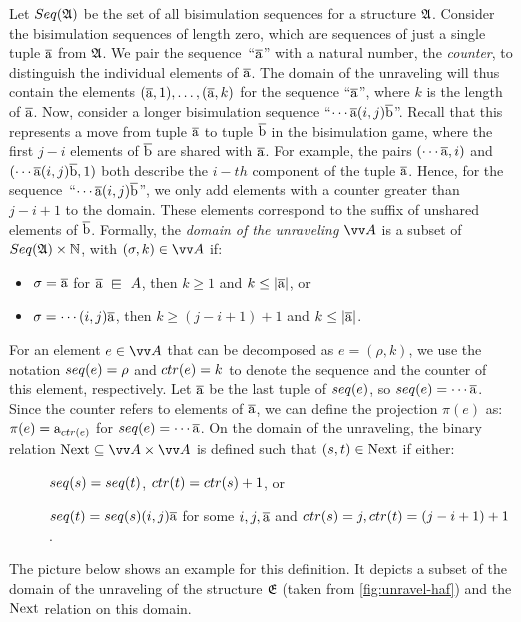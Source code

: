 Let $\Seq{\str{A}}$ be the set of all bisimulation sequences for a structure ${\mathfrak{A}}$.
Consider the bisimulation sequences of length zero, which are sequences of just a single tuple $\overline{\mathrm{a}}$ from ${\mathfrak{A}}$.
We pair the sequence~``$\overline{\mathrm{a}}$'' with a natural number, the \emph{counter}, to distinguish the individual elements of $\overline{\mathrm{a}}$.
The domain of the unraveling will thus contain the elements $(\overline{\mathrm{a}}, 1), \ldots, (\overline{\mathrm{a}}, k)$ for the sequence ``$\overline{\mathrm{a}}$'', where $k$ is the length of $\overline{\mathrm{a}}$.
Now, consider a longer bisimulation sequence ``$\cdots \overline{\mathrm{a}} (i,j) \overline{\mathrm{b}}$''.
Recall that this represents a move from tuple $\overline{\mathrm{a}}$ to tuple $\overline{\mathrm{b}}$ in the bisimulation game,
where the first $j-i$ elements of $\overline{\mathrm{b}}$ are shared with $\overline{\mathrm{a}}$.
For example, the pairs $(\cdots \overline{\mathrm{a}}, i)$ and $(\cdots \overline{\mathrm{a}} (i,j) \overline{\mathrm{b}}, 1)$ both describe the $i-th$ component of the tuple $\overline{\mathrm{a}}$.
Hence, for the sequence~``$\cdots\overline{\mathrm{a}}(i,j)\overline{\mathrm{b}}$'', we only add elements with a counter greater than $j-i+1$ to the domain.
These elements correspond to the suffix of unshared elements of $\overline{\mathrm{b}}$.
Formally, the \emph{domain of the unraveling} $\unraveldom{A}$ is a subset of $\Seq{A} \times \mathbb{N}$, with $(\sigma, k) \in \unraveldom{A}$ if:
\begin{itemize}
  \item $\sigma = \overline{\mathrm{a}}$ for $\elemtuplea \sqin A$, then $k \ge 1$ and $k \le |\overline{\mathrm{a}}|$, or
  \item $\sigma = \cdots (i,j) \overline{\mathrm{a}}$, then $k \ge (j-i+1) + 1$ and $k \le |\overline{\mathrm{a}}|$.
\end{itemize}
For an element $e \in \unraveldom{A}$ that can be decomposed as $e = (\rho, k)$, we use the notation $\seq{e} = \rho$ and $\ctr{e} = k$ to denote the sequence and the counter of this element, respectively.
Let $\overline{\mathrm{a}}$ be the last tuple of $\seq{e}$, so $\seq{e} = \cdots \elemtuplea$.
Since the counter refers to elements of $\overline{\mathrm{a}}$, we can define the projection $\pi(e)$ as: $\pi(e) = \elema_{\ctr{e}}$ for $\seq{e} = \cdots\elemtuplea$.
On the domain of the unraveling, the binary relation $\relNext \subseteq \unraveldom{A} \times \unraveldom{A}$ is defined such that $(s, t) \in \mathrm{Next}$ if either:
\begin{description}
  \item[] $\seq{s} = \seq{t}$, $\ctr{t} = \ctr{s} + 1$, or
  \item[] $\seq{t} = \seq{s} (i,j) \elemtuplea$ for some $i, j, \overline{\mathrm{a}}$ and $\ctr{s} = j, \ctr{t} = (j - i + 1) + 1$.
\end{description}
The picture below shows an example for this definition.
It depicts a subset of the domain of the unraveling of the structure ${\mathfrak{E}}$ (taken from \cref{fig:unravel-haf}) and the $\mathrm{Next}$ relation on this domain.

